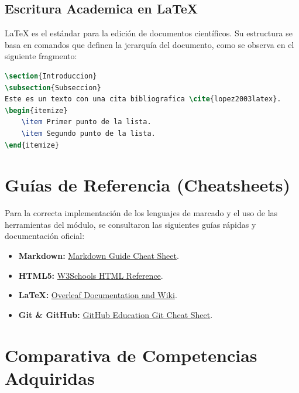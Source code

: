 \documentclass[runningheads]{llncs}
\begin{document}
\subsection{Escritura Academica en LaTeX}
LaTeX es el estándar para la edición de documentos científicos. Su estructura se basa en comandos que definen la jerarquía del documento, como se observa en el siguiente fragmento:

\begin{lstlisting}[language=TeX, caption=Sintaxis basica de LaTeX]
\section{Introduccion}
\subsection{Subseccion}
Este es un texto con una cita bibliografica \cite{lopez2003latex}.
\begin{itemize}
    \item Primer punto de la lista.
    \item Segundo punto de la lista.
\end{itemize}
\end{lstlisting}

\section{Guías de Referencia (Cheatsheets)}

Para la correcta implementación de los lenguajes de marcado y el uso de las herramientas del módulo, se consultaron las siguientes guías rápidas y documentación oficial:

\begin{itemize}
    \item \textbf{Markdown:} \href{https://www.markdownguide.org/cheat-sheet/}{Markdown Guide Cheat Sheet}.
    \item \textbf{HTML5:} \href{https://www.w3schools.com/tags/default.asp}{W3Schools HTML Reference}.
    \item \textbf{LaTeX:} \href{https://overleaf.com/learn}{Overleaf Documentation and Wiki}.
    \item \textbf{Git \& GitHub:} \href{https://education.github.com/git-cheat-sheet-education.pdf}{GitHub Education Git Cheat Sheet}.
\end{itemize}

\section{Comparativa de Competencias Adquiridas}
\end{document}
